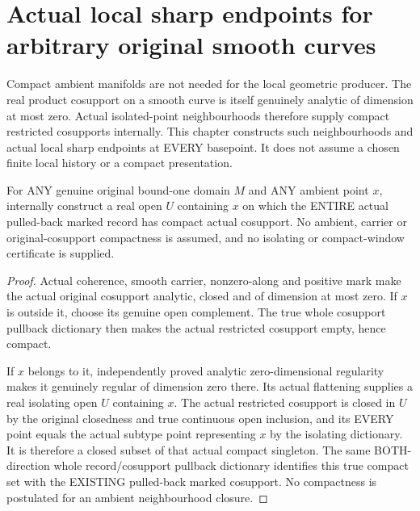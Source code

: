 \section{Actual local sharp endpoints for arbitrary original smooth curves}

Compact ambient manifolds are not needed for the local geometric producer.
The real product cosupport on a smooth curve is itself genuinely analytic
of dimension at most zero. Actual isolated-point neighbourhoods therefore
supply compact restricted cosupports internally. This chapter constructs
such neighbourhoods and actual local sharp endpoints at EVERY basepoint.
It does not assume a chosen finite local history or a compact presentation.

\begin{lemma}
\label{hir:sharp-actual-curve-internally-compact-local-cosupport}
\leanok
For ANY genuine original bound-one domain $M$ and ANY ambient point $x$,
internally construct a real open $U$ containing $x$ on which the ENTIRE
actual pulled-back marked record has compact actual cosupport. No ambient,
carrier or original-cosupport compactness is assumed, and no isolating or
compact-window certificate is supplied.
\end{lemma}
\begin{proof}
Actual coherence, smooth carrier, nonzero-along and positive mark make the
actual original cosupport analytic, closed and of dimension at most zero.
If $x$ is outside it, choose its genuine open complement. The true whole
cosupport pullback dictionary then makes the actual restricted cosupport
empty, hence compact.

If $x$ belongs to it, independently proved analytic zero-dimensional
regularity makes it genuinely regular of dimension zero there. Its actual
flattening supplies a real isolating open $U$ containing $x$. The actual
restricted cosupport is closed in $U$ by the original closedness and true
continuous open inclusion, and its EVERY point equals the actual subtype
point representing $x$ by the isolating dictionary. It is therefore a
closed subset of that actual compact singleton. The same BOTH-direction
whole record/cosupport pullback dictionary identifies this true compact
set with the EXISTING pulled-back marked cosupport. No compactness is
postulated for an ambient neighbourhood closure.
\end{proof}

